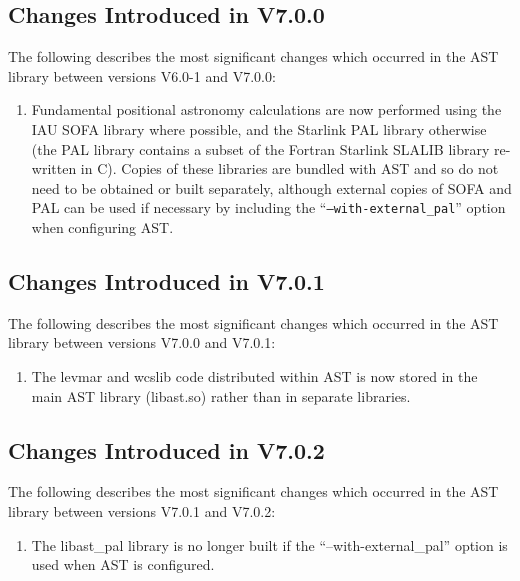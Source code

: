 \documentclass[twoside,11pt]{starlink}
\begin{document}
\subsection{Changes Introduced in V7.0.0}

The following describes the most significant changes which
occurred in the AST library between versions V6.0-1 and V7.0.0:

\begin{enumerate}

\item Fundamental positional astronomy calculations are now performed
using the IAU SOFA library where possible, and the Starlink PAL library 
otherwise (the PAL library contains a subset of the Fortran Starlink SLALIB
library re-written in C). Copies of these libraries are bundled with AST
and so do not need to be obtained or built separately, although external
copies of SOFA and PAL can be used if necessary by including the
``\texttt{--with-external\_pal}'' option when configuring AST.

\end{enumerate}

\subsection{Changes Introduced in V7.0.1}

The following describes the most significant changes which
occurred in the AST library between versions V7.0.0 and V7.0.1:

\begin{enumerate}

\item The levmar and wcslib code distributed within AST is now stored in the
main AST library (libast.so) rather than in separate libraries.

\end{enumerate}

\subsection{Changes Introduced in V7.0.2}

The following describes the most significant changes which
occurred in the AST library between versions V7.0.1 and V7.0.2:

\begin{enumerate}

\item The libast\_pal library is no longer built if the
``--with-external\_pal'' option is used when AST is configured.

\end{enumerate}
\end{document}
